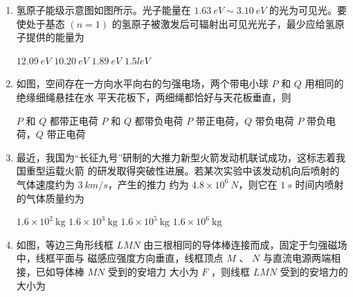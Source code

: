\begin{enumerate}
\renewcommand{\labelenumi}{\arabic{enumi}.}
\item
氢原子能级示意图如图所示。光子能量在 $ 1.63 \ eV \sim 3.10 \ eV $ 的光为可见光。要使处于基态 $ (n=1) $
的氢原子被激发后可辐射出可见光光子，最少应给氢原子提供的能量为  



\begin{figure}[h!]
\centering

\end{figure}



\fourchoices
{$ 12.09 \ eV $}
{$ 10.20 \ eV $}
{$ 1.89 \ eV $}
{$ 1.5leV $}



\item
如图，空间存在一方向水平向右的匀强电场，两个带电小球 $ P $ 和 $ Q $ 用相同的绝缘细绳悬挂在水
平天花板下，两细绳都恰好与天花板垂直，则  

\begin{figure}[h!]
\centering

\end{figure}

\fourchoices
{$ P $ 和 $ Q $ 都带正电荷}
{$ P $ 和 $ Q $ 都带负电荷}
{$ P $ 带正电荷，$ Q $ 带负电荷}
{$ P $ 带负电荷，$ Q $ 带正电荷}


\newpage
\item
最近，我国为“长征九号”研制的大推力新型火箭发动机联试成功，这标志着我国重型运载火箭
的研发取得突破性进展。若某次实验中该发动机向后喷射的气体速度约为 $ 3 \ km/s $，产生的推力
约为 $ 4.8 \times 10^{6} \ N $，则它在 $ 1 \ s $ 时间内喷射的气体质量约为  


\fourchoices
{$1.6 \times 10^{2} \ \mathrm{kg}$}
{$1.6 \times 10^{3} \ \mathrm{kg}$}
{$1.6 \times 10^{5}\ \mathrm{kg}$}
{$1.6 \times 10^{6}\ \mathrm{kg}$}

\banswer{

}


\item 
如图，等边三角形线框 $ LMN $ 由三根相同的导体棒连接而成，固定于匀强磁场中，线框平面与
磁感应强度方向垂直，线框顶点 $ M $ 、 $ N $ 与直流电源两端相接，已如导体棒 $ MN $ 受到的安培力
大小为 $ F $ ，则线框 $ LMN $ 受到的安培力的大小为  


\end{enumerate}
